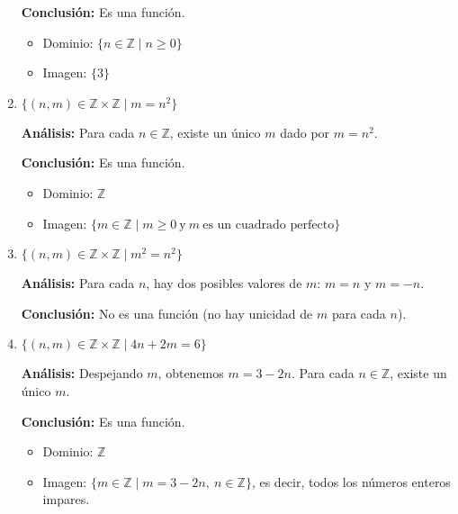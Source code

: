 \begin{solution}
\begin{enumerate}
    \textbf{Conclusión:} Es una función.
    
    \begin{itemize}
        \item Dominio: \( \{ n \in \mathbb{Z} \mid n \geq 0 \} \)
        \item Imagen: \( \{3\} \)
    \end{itemize}
    
    
    \item \(\{(n, m) \in \mathbb{Z} \times \mathbb{Z} \mid m = n^2\}\)
    
    \textbf{Análisis:} Para cada \( n \in \mathbb{Z} \), existe un único \( m \) dado por \( m = n^2 \).
    
    \textbf{Conclusión:} Es una función.
    
    \begin{itemize}
        \item Dominio: \( \mathbb{Z} \)
        \item Imagen: \( \{ m \in \mathbb{Z} \mid m \geq 0 \ \text{y} \ m \ \text{es un cuadrado perfecto} \} \)
    \end{itemize}
    
    \item \(\{(n, m) \in \mathbb{Z} \times \mathbb{Z} \mid m^2 = n^2\}\)
    
    \textbf{Análisis:} Para cada \( n \), hay dos posibles valores de \( m \): \( m = n \) y \( m = -n \).
    
    \textbf{Conclusión:} No es una función (no hay unicidad de \( m \) para cada \( n \)).
    
    \item \(\{(n, m) \in \mathbb{Z} \times \mathbb{Z} \mid 4n + 2m = 6\}\)
    
    \textbf{Análisis:} Despejando \( m \), obtenemos \( m = 3 - 2n \). Para cada \( n \in \mathbb{Z} \), existe un único \( m \).
    
    \textbf{Conclusión:} Es una función.
    
    \begin{itemize}
        \item Dominio: \( \mathbb{Z} \)
        \item Imagen: \( \{ m \in \mathbb{Z} \mid m = 3 - 2n, \ n \in \mathbb{Z} \} \), es decir, todos los números enteros impares.
    \end{itemize}
\end{enumerate}
\end{solution}